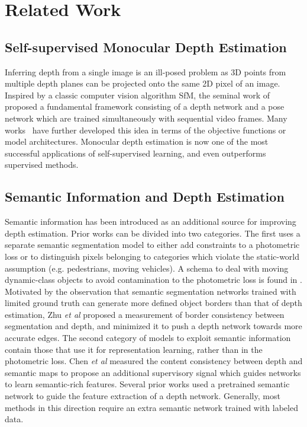 \documentclass{bmvc2k}
\def\etal{\emph{et al}\bmvaOneDot}
\begin{document}
\section{Related Work}
\label{related_work}
\subsection{Self-supervised Monocular Depth Estimation}
Inferring depth from a single image is an ill-posed problem as 3D points from multiple depth planes can be projected onto the same 2D pixel of an image. Inspired by a classic computer vision algorithm SfM, the seminal work of~\cite{zhou_sfmlearner} proposed a fundamental framework consisting of a depth network and a pose network which are trained simultaneously with sequential video frames. Many works~\cite{monodepth2, watson2021temporal, poggi2020uncertainty, wang2020self, kuznietsov2021comoda, gonzalezbello2020forget,johnston2020self, guizilini2020, zhou2020constant} have further developed this idea in terms of the objective functions or model architectures. Monocular depth estimation is now one of the most successful applications of self-supervised learning, and even outperforms supervised methods.  
\subsection{Semantic Information and Depth Estimation}
Semantic information has been introduced as an additional source for improving depth estimation. Prior works can be divided into two categories. The first uses a separate semantic segmentation model to either add constraints to a photometric loss or to distinguish pixels belonging to categories which violate the static-world assumption (e.g. pedestrians, moving vehicles).
A schema to deal with moving dynamic-class objects to avoid contamination to the photometric loss is found in \cite{klingner2020self}.
Motivated by the observation that semantic segmentation networks trained with limited ground truth can generate more defined object borders than that of depth estimation, Zhu \etal \cite{Zhu_2020_CVPR} proposed a measurement of border consistency between segmentation and depth, and minimized it to push a depth network towards more accurate edges. 
The second category of models to exploit semantic information contain those that use it for representation learning, rather than in the photometric loss. Chen \etal \cite{chen2019towards} measured the content consistency between depth and semantic maps to propose an additional supervisory signal which guides networks to learn semantic-rich features. Several prior works  \cite{guizilini2020semantically, choi2020safenet,kumar2021syndistnet} used a pretrained semantic network to guide the feature extraction of a depth network. Generally, most methods in this direction require an extra semantic network trained with labeled data. 
\end{document}
